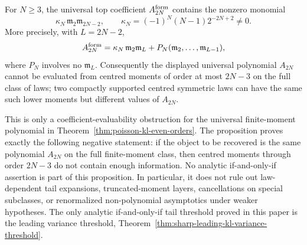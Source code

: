 \begin{proposition}%
\label{prop:poisson-kl-moment-threshold-sharpness}
\label{prop:analytic-first-evaluability-obstruction}
For \(N\ge3\), the universal top coefficient \(A_{2N}^{\rm form}\) contains
the nonzero monomial
\[
\kappa_N\,\mathfrak m_2\mathfrak m_{2N-2},
\qquad
\kappa_N=(-1)^N(N-1)2^{-2N+2}\ne0 .
\]
More precisely, with \(L=2N-2\),
\[
  A_{2N}^{\rm form}
  =\kappa_N\,\mathfrak m_2\mathfrak m_L
  +P_N(\mathfrak m_2,\ldots,\mathfrak m_{L-1}),
\]
where \(P_N\) involves no \(\mathfrak m_L\).  Consequently the displayed
universal polynomial \(A_{2N}\) cannot be evaluated from centred moments of
order at most \(2N-3\) on the full class of laws; two compactly supported
centred symmetric laws can have the same such lower moments but different
values of \(A_{2N}\).

This is only a coefficient-evaluability obstruction for the universal
finite-moment polynomial in
Theorem~\ref{thm:poisson-kl-even-orders}.  The proposition proves exactly the
following negative statement: if the object to be recovered is the same
polynomial \(A_{2N}\) on the full finite-moment class, then centred moments
through order \(2N-3\) do not contain enough information.  No analytic
if-and-only-if assertion is part of this proposition.  In particular, it does
not rule out law-dependent tail expansions, truncated-moment
layers, cancellations on special subclasses, or renormalized non-polynomial
asymptotics under weaker hypotheses.  The only analytic if-and-only-if tail
threshold proved in this paper is the leading variance threshold,
Theorem~\ref{thm:sharp-leading-kl-variance-threshold}.
\end{proposition}

